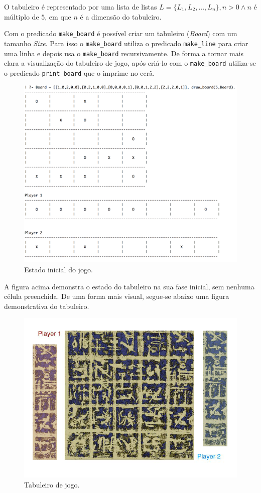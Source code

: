 \documentclass[a4paper]{article}
\begin{document}
O tabuleiro é representado por uma lista de listas  $L = \{L_1, L_2, ... , L_n\} , n > 0  \wedge n$ é múltiplo de $5$, em que $n$ é a dimensão do tabuleiro. \par
Com o predicado \texttt{make\_board} é possível criar um tabuleiro (\textit{Board}) com um tamanho \textit{Size}. Para isso o \texttt{make\_board} utiliza o predicado \texttt{make\_line} para criar uma linha e depois usa o \texttt{make\_board} recursivamente. De forma a tornar mais clara a visualização do tabuleiro de jogo, após criá-lo com o \texttt{make\_board} utiliza-se o predicado \texttt{print\_board} que o imprime no ecrã.

\begin{figure}[!htb]
	\centering
	\includegraphics[scale=0.45]{images/make_board.png}
	\caption{Estado inicial do jogo.}
\end{figure}

A figura acima demonstra o estado do tabuleiro na sua fase inicial, sem nenhuma célula preenchida. De uma forma mais visual, segue-se abaixo uma figura demonstrativa do tabuleiro.

\begin{figure}[!htb]
	\centering
	\includegraphics[scale=0.3]{images/board.png}
	\caption{Tabuleiro de jogo.}
\end{figure}
\end{document}
